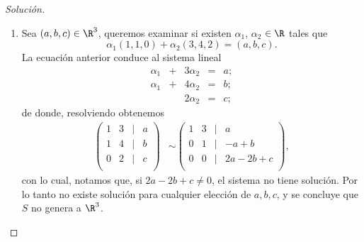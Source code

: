 \documentclass[a4,11pt]{aleph-notas}
\begin{document}
\begin{proof}[Solución]\hspace{0pt}
    \begin{enumerate}
        \item Sea $(a, b, c) \in \R^3$, queremos examinar si existen $\alpha_1$, $\alpha_2$ $\in \R$ tales que  
        \[
        \alpha_{1} (1, 1, 0) + \alpha_{2} (3, 4, 2) =(a, b, c).
        \]
        La ecuación anterior conduce al sistema lineal
        \[
        \begin{array}{rrrrrrr}
         \alpha _{1} & + & 3\alpha_{2} & = & a; \\
         \alpha _{1} & + & 4\alpha_{2} & = & b;\\
         & & 2\alpha_{2} & = & c;
         \end{array}
         \]
         de donde, resolviendo obtenemos
         \begin{align*}
        \begin{pmatrix}
            1&3&|&a\\
            1&4&|&b\\
            0&2&|&c\\
        \end{pmatrix}
        & \sim 
        \begin{pmatrix}
            1&3&|&a\\
            0&1&|&-a+b\\
            0&0&|&2a - 2b +c\\
        \end{pmatrix},
        \end{align*}
        con lo cual, notamos que, si $2a - 2b + c \neq 0$, el sistema no tiene solución. Por lo tanto no existe solución para cualquier elección de $a, b, c$, y se concluye que $S$ no genera a $\R^3$.
        

\end{enumerate}
\end{proof}
\end{document}
